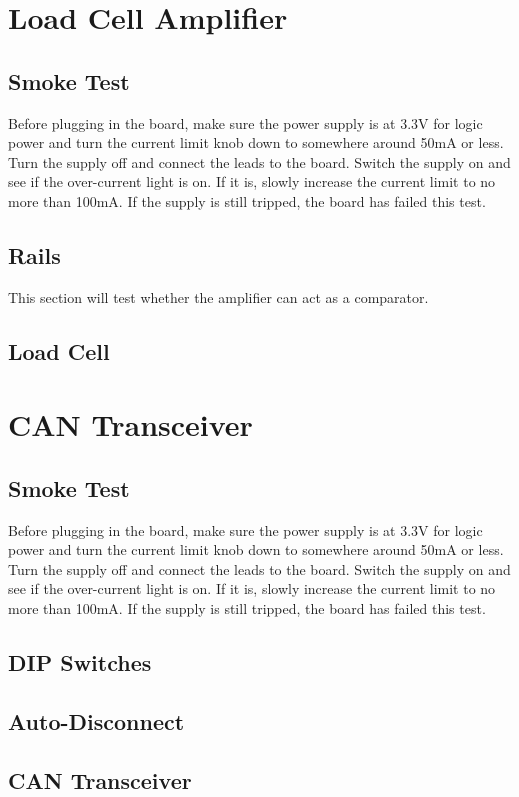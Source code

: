 \documentclass[12pt,letterpaper]{article}
\begin{document}
	\newpage
	\section{Load Cell Amplifier}
	\subsection{Smoke Test}
	Before plugging in the board, make sure the power supply is at 3.3V for logic power and turn the current limit knob down to somewhere around 50mA or less. Turn the supply off and connect the leads to the board. Switch the supply on and see if the over-current light is on. If it is, slowly increase the current limit to no more than 100mA. If the supply is still tripped, the board has failed this test.
	
	\subsection{Rails}
	This section will test whether the amplifier can act as a comparator. 
	
	\subsection{Load Cell}
	
	\newpage
	\section{CAN Transceiver}
	\subsection{Smoke Test}
	Before plugging in the board, make sure the power supply is at 3.3V for logic power and turn the current limit knob down to somewhere around 50mA or less. Turn the supply off and connect the leads to the board. Switch the supply on and see if the over-current light is on. If it is, slowly increase the current limit to no more than 100mA. If the supply is still tripped, the board has failed this test.
	
	\subsection{DIP Switches}
	\subsection{Auto-Disconnect}
	\subsection{CAN Transceiver}
	
\end{document}
